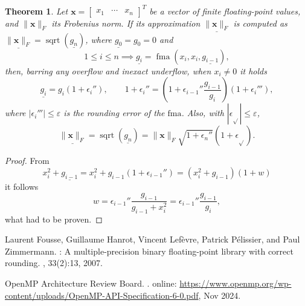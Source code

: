 \documentclass[a4paper,12pt,twoside]{article}
\newtheorem{thm}{Theorem}
\begin{document}
\begin{thm}\label{t:3}
  Let $\mathbf{x}=\begin{bmatrix}x_1&\cdots&x_n\end{bmatrix}^T$ be a
  vector of finite floating-point values, and $\|\mathbf{x}\|_F$ its
  Frobenius norm.  If its approximation $\underline{\|\mathbf{x}\|_F}$
  is computed as
  $\underline{\|\mathbf{x}\|_F}=\mathop\mathrm{sqrt}(\underline{g_n})$,
  where $\underline{g_0}=g_0=0$ and
  \begin{displaymath}
    1\le i\le n\implies\underline{g_i}=\mathop{\mathrm{fma}}(x_i,x_i,\underline{g_{i-1}}),
  \end{displaymath}
  then, barring any overflow and inexact underflow, when $x_i\ne 0$ it
  holds
  \begin{equation}
    \underline{g_i^{}}=g_i^{}(1+\epsilon_i''),\qquad
    1+\epsilon_i''=\left(1+\epsilon_{i-1}''\frac{g_{i-1}^{}}{g_i^{}}\right)(1+\epsilon_i'''),
    \label{e:11}
  \end{equation}
  where $|\epsilon_i'''|\le\varepsilon$ is the rounding error of the
  $\mathrm{fma}$.  Also, with $|\epsilon_{\sqrt{}}|\le\varepsilon$,
  \begin{displaymath}
    \underline{\|\mathbf{x}\|_F^{}}=\mathop{\mathrm{sqrt}}(\underline{g_n^{}})=\|\mathbf{x}\|_F^{}\sqrt{1+\epsilon_n''}(1+\epsilon_{\sqrt{}}^{}).
  \end{displaymath}
\end{thm}
\begin{proof}
  From
  \begin{displaymath}
    x_i^2+\underline{g_{i-1}^{}}=x_i^2+g_{i-1}^{}(1+\epsilon_{i-1}'')=(x_i^2+g_{i-1}^{})(1+w)
  \end{displaymath}
  it follows
  \begin{displaymath}
    w=\epsilon_{i-1}''\frac{g_{i-1}^{}}{g_{i-1}^{}+x_i^2}=\epsilon_{i-1}''\frac{g_{i-1}^{}}{g_i^{}},
  \end{displaymath}
  what had to be proven.
\end{proof}
%
%
\begin{thebibliography}{1}

Laurent Fousse, Guillaume Hanrot, Vincent Lef\`{e}vre, Patrick P\'{e}lissier,
  and Paul Zimmermann.
: A multiple-precision binary floating-point library with
  correct rounding.
, 33(2):13, 2007.

{OpenMP Architecture Review Board}.
.
\newblock online:
  \url{https://www.openmp.org/wp-content/uploads/OpenMP-API-Specification-6-0.pdf},
  Nov 2024.

\end{thebibliography}
%
\end{document}
